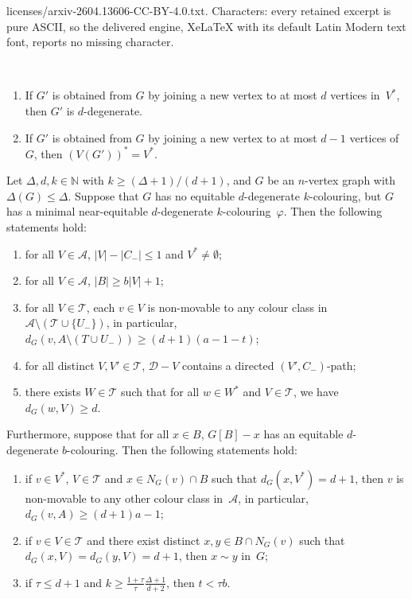 \documentclass[10pt,a4paper]{amsart}
\begin{document}
licenses/arxiv-2604.13606-CC-BY-4.0.txt. Characters: every retained excerpt is pure ASCII, so the delivered engine, XeLaTeX with its default Latin Modern text font, reports no missing character.
\begin{fact}\label{lemma:d-degenerate}~
	\begin{enumerate}[label={\rm(\alph*)}, start=1]
		\item  If $G'$ is obtained from $G$ by joining a new vertex to  at most $d$
		vertices in~$V^{*}$, then $G'$ is $d$-degenerate.\label{d-degenerate-a}
		\item 	 	If $G'$  is obtained
		from $G$ by joining a new vertex to  at most $d-1$
		vertices  of $G$, then $(V(G'))^{*}=V^{*}$.\label{d-degenerate-b}
\end{enumerate}
\end{fact}

	\begin{lem}\label{lemma:common-properties}
	Let $\Delta, d,k \in \mathbb{N}$ with $k \ge (\Delta+1)/(d+1)$, and $G$ be an $n$-vertex graph with $\Delta(G)\leq\Delta$.
		Suppose that $G$ has no equitable $d$-degenerate $k$-colouring, but $G$ has a minimal near-equitable $d$-degenerate $k$-colouring~$\varphi$.
	Then the following statements hold:
\begin{enumerate}[label={\rm (\alph*)},start=1]
\item  for all $V\in \mathcal{A}$,  $|V|-|C_-| \le 1$ and $V^*\neq \emptyset$; \label{a}
\item  for all $V\in \mathcal{A}$, $|B| \ge b |V|+1$;
 \label{b}		
\item for all $V\in \mathcal{T}$, each $v \in V$ is non-movable to any colour class in $\mathcal{A}\setminus ( \mathcal{T}\cup \{U_-\})$, in particular, $d_G(v,A \setminus (T \cup U_-)) \ge (d+1)(a-1-t)$; \label{c}
\item for all distinct $V,V'\in \mathcal{T}$, $\mathcal{D}-V$ contains a directed $(V',C_-)$-path; \label{d}
\item there exists $W\in \mathcal{T}$ such that for all $w\in W^{*}$ and $V\in \mathcal{T}$, we have $d_G(w,V) \ge d$.\label{e}	
\end{enumerate}			
Furthermore,  suppose that for all $x \in B$, $G[B]-x$ has an equitable $d$-degenerate $b$-colouring.
Then the following statements hold:	
\begin{enumerate}	[label={\rm (\alph*)},start=6]		
\item
if $v \in V^*$, $V  \in \mathcal{T}$ and $x \in N_G(v) \cap B$ such that $d_G(x,V^*) =d+1$, then $v$ is non-movable to any other colour class in~$\mathcal{A}$, in particular, $d_G(v,A) \ge (d+1)a-1$;
	  \label{f}
\item   if $ v \in V \in \mathcal{T}$ and there exist distinct $x,y \in B\cap N_{G}(v)$ such that
$d_G(x,V)  = d_G(y,V) =d+1$, then $x \sim y$ in~$G$; \label{g}		
\item   if $\tau \le d+1$ and $ k \ge \frac{1+\tau}{\tau} \frac{\Delta+1}{d+2}$, then $t < \tau b$. \label{h}
\end{enumerate}
\end{lem}
\end{document}
